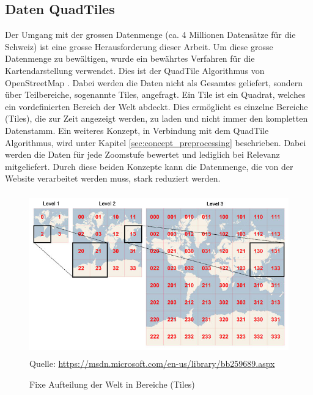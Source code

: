 \subsection{Daten QuadTiles}
\label{ch:datentiles}
Der Umgang mit der grossen Datenmenge (ca. 4 Millionen Datensätze für die Schweiz) ist eine grosse Herausforderung dieser Arbeit. Um diese grosse Datenmenge zu bewältigen, wurde ein bewährtes Verfahren für die Kartendarstellung verwendet. Dies ist der QuadTile Algorithmus von OpenStreetMap \citep{OSMQuadTiles}. Dabei werden die Daten nicht als Gesamtes geliefert, sondern über Teilbereiche, sogenannte Tiles, angefragt. Ein Tile ist ein Quadrat, welches ein vordefinierten Bereich der Welt abdeckt. Dies ermöglicht es einzelne Bereiche (Tiles), die zur Zeit angezeigt werden, zu laden und nicht immer den kompletten Datenstamm. Ein weiteres Konzept, in Verbindung mit dem QuadTile Algorithmus, wird unter Kapitel \ref{sec:concept_preprocessing}  beschrieben. Dabei werden die Daten für jede Zoomstufe bewertet und lediglich bei Relevanz mitgeliefert. Durch diese beiden Konzepte kann die Datenmenge, die von der Website verarbeitet werden muss, stark reduziert werden.
\begin{figure}[H]
\centering
\includegraphics[height=7cm]{images/BingMapsTileSystem.jpg}
\\Quelle: \href{https://msdn.microsoft.com/en-us/library/bb259689.aspx}{https://msdn.microsoft.com/en-us/library/bb259689.aspx}
\caption{Fixe Aufteilung der Welt in Bereiche (Tiles)}
\label{fig:tilesystem}
\end{figure}
\noindent
